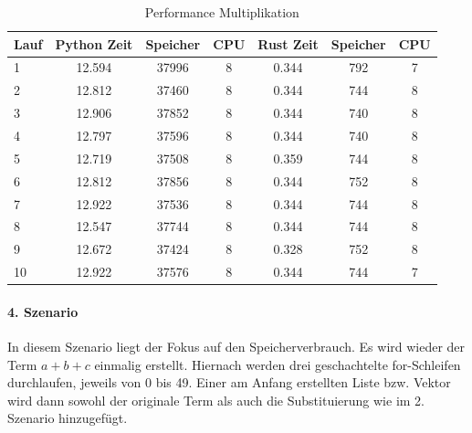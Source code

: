 \documentclass[11pt,a4paper, ngerman]{article}
\begin{document}
\begin{table}[ht!]
    \caption{Performance Multiplikation}
    \centering
    \begin{tabular}{|l|c|c|c|c|c|c|}
        \hline
        \textbf{Lauf} & \textbf{Python Zeit} & \textbf{Speicher} & \textbf{CPU} & \textbf{Rust Zeit} & \textbf{Speicher} & \textbf{CPU} \\
        \hline
        1 & 12.594 & 37996 & 8 & 0.344 & 792 & 7 \\
        \hline
        2 & 12.812 & 37460 & 8 & 0.344 & 744 & 8 \\
        \hline
        3 & 12.906 & 37852 & 8 & 0.344 & 740 & 8 \\
        \hline
        4 & 12.797 & 37596 & 8 & 0.344 & 740 & 8 \\
        \hline
        5 & 12.719 & 37508 & 8 & 0.359 & 744 & 8 \\
        \hline
        6 & 12.812 & 37856 & 8 & 0.344 & 752 & 8 \\
        \hline
        7 & 12.922 & 37536 & 8 & 0.344 & 744 & 8 \\
        \hline
        8 & 12.547 & 37744 & 8 & 0.344 & 744 & 8 \\
        \hline
        9 & 12.672 & 37424 & 8 & 0.328 & 752 & 8 \\
        \hline
        10 & 12.922 & 37576 & 8 & 0.344 & 744 & 7 \\
        \hline
    \end{tabular}
\end{table}

\paragraph{4. Szenario} In diesem Szenario liegt der Fokus auf den Speicherverbrauch. Es wird wieder der Term $a+b+c$ einmalig erstellt. Hiernach werden drei geschachtelte for-Schleifen durchlaufen, jeweils von 0 bis 49. Einer am Anfang erstellten Liste bzw. Vektor wird dann sowohl der originale Term als auch die Substituierung wie im 2. Szenario hinzugefügt.
\end{document}
